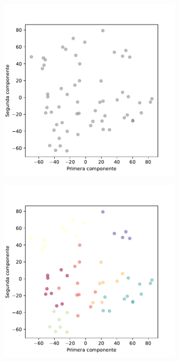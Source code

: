 \begin{figure}[h]
  \centering
  \begin{subfigure}{0.45\textwidth}
    \centering
    \includegraphics[width=\textwidth]{figures/behav-pca-4128-202012-02.pdf}
    \caption{}
    \label{fig:behav-pca}
  \end{subfigure}
  \begin{subfigure}{0.45\textwidth}
    \centering
    \includegraphics[width=\textwidth]{figures/behav-aff-4128-202012-02.pdf}

\end{subfigure}
\end{figure}
